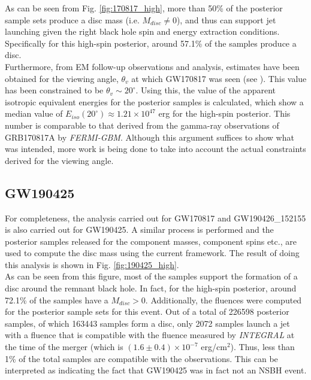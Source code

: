     As can be seen from Fig. \ref{fig:170817_high}, more than 50\% of the posterior
    sample sets produce a disc mass (i.e. $M_{disc} \neq 0$), and thus can support jet
    launching given the right black hole spin and energy extraction conditions.
    Specifically for this high-spin posterior, around 57.1\% of the samples produce a
    disc.\\
    Furthermore, from EM follow-up observations and analysis, estimates have been
    obtained for the viewing angle, $\theta_v$ at which GW170817 was seen (see
    \cite{finstad_2018}). This value has been constrained to be $\theta_v \sim
    20^{\circ}$. Using this, the value of the apparent isotropic equivalent energies for
    the posterior samples is calculated, which show a median value of
    $E_{iso}(20^{\circ}) \approx 1.21 \times 10^{47}$ erg for the high-spin posterior.
    This number is comparable to that derived from the gamma-ray observations of
    GRB170817A by \textit{FERMI-GBM}. Although this argument suffices to show what was intended,
    more work is being done to take into account the actual constraints derived
    for the viewing angle.

    \subsection{GW190425}\label{ssec:nsbh_190425}

        For completeness, the analysis carried out for GW170817 and GW190426\_152155 is
        also carried out for GW190425. A similar process is performed and the
        posterior samples released for the component masses, component spins etc., are
        used to compute the disc mass using the current framework. The result of doing
        this analysis is shown in Fig. \ref{fig:190425_high}.\\
        As can be seen from this figure, most of the samples support the formation of
        a disc around the remnant black hole. In fact, for the high-spin posterior,
        around 72.1\% of the samples have a $M_{disc} > 0$. Additionally, the fluences
        were computed for the posterior sample sets for this event. Out of a total of
        226598 posterior samples, of which 163443 samples form a disc, only 2072 samples
        launch a jet with a fluence that is compatible with the fluence measured by
        \textit{INTEGRAL} at the time of the merger (which is $(1.6 \pm 0.4) \times 10^{-7}$
        erg/cm$^2$). Thus, less than 1\% of the total samples are compatible with the
        observations. This can be interpreted as indicating the fact that GW190425 was
        in fact not an NSBH event.\\

